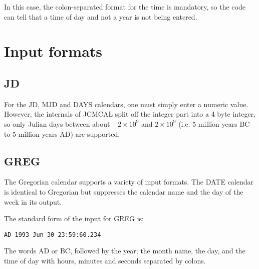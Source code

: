 \documentclass{article}
\begin{document}
In this case, the colon-separated format for the time is mandatory,
so the code can tell that a time of day and not a year is not being entered.

\section{Input formats}

\subsection{JD}

For the JD, MJD and DAYS calendars, one must simply enter a
numeric value. However, the internals of JCMCAL split
off the integer part into a 4 byte integer, so only
Julian days between about $-2\times10^9$ and $2\times10^9$
(i.e. 5 million years BC to 5 million years AD) are supported.

\subsection{GREG}

The Gregorian calendar supports a variety of input formats.
The DATE calendar is identical to Gregorian but suppresses
the calendar name and the day of the week in its output.

The standard form of the input for GREG is:
\begin{verbatim}
AD 1993 Jun 30 23:59:60.234 
\end{verbatim}
The words AD or BC, followed by the year, the month name, the
day, and the time of day with hours, minutes and seconds
separated by colons.
\end{document}
